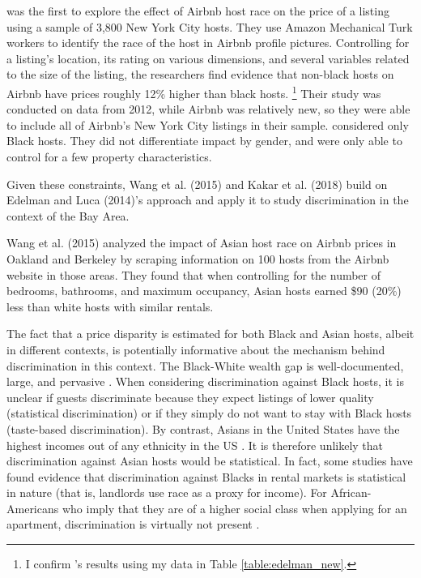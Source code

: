 \cite{edelman} was the first to explore the effect of Airbnb host race on the price of a listing using a sample of 3,800 New York City hosts. They use Amazon Mechanical Turk workers to identify the race of the host in Airbnb profile pictures. Controlling for a listing's location, its rating on various dimensions, and several variables related to the size of the listing, the researchers find evidence that non-black hosts on Airbnb have prices roughly 12\% higher than black hosts.%
	\footnote{I confirm \cite{edelman}’s results using my data in Table \ref{table:edelman_new}.} 
Their study was conducted on data from 2012, while Airbnb was relatively new, so they were able to include all of Airbnb's New York City listings in their sample. \cite{edelman} considered only Black hosts. They did not differentiate impact by gender, and were only able to control for a few property characteristics. 

Given these constraints, Wang et al. (2015) and Kakar et al. (2018) build on Edelman and Luca (2014)’s approach and apply it to study discrimination in the context of the Bay Area. 

Wang et al. (2015) analyzed the impact of Asian host race on Airbnb prices in Oakland and Berkeley by scraping information on 100 hosts from the Airbnb website in those areas. They found that when controlling for the number of bedrooms, bathrooms, and maximum occupancy, Asian hosts earned \$90 (20\%) less than white hosts with similar rentals. 

The fact that a price disparity is estimated for both Black and Asian hosts, albeit in different contexts, is potentially informative about the mechanism behind discrimination in this context. The Black-White wealth gap is well-documented, large, and pervasive \citep{cfed, heywood, bayard, mason, chiteji, altonji, gittleman}. When considering discrimination against Black hosts, it is unclear if guests discriminate because they expect listings of lower quality (statistical discrimination) or if they simply do not want to stay with Black hosts (taste-based discrimination). By contrast, Asians in the United States have the highest incomes out of any ethnicity in the US \citep{income}. It is therefore unlikely that discrimination against Asian hosts would be statistical. In fact, some studies have found evidence that discrimination against Blacks in rental markets is statistical in nature (that is, landlords use race as a proxy for income). For African-Americans who imply that they are of a higher social class when applying for an apartment, discrimination is virtually not present \citep{hanson}.




